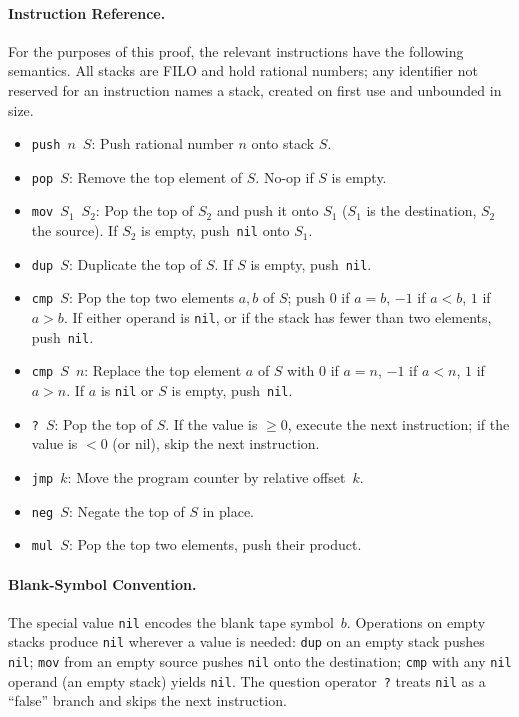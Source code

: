 \paragraph{Instruction Reference.}
For the purposes of this proof, the relevant \sculpt instructions have the following semantics. All stacks are FILO and hold rational numbers; any identifier not reserved for an instruction names a stack, created on first use and unbounded in size.

\begin{itemize}
    \item \texttt{push}~$n$~$S$: Push rational number $n$ onto stack $S$.
    \item \texttt{pop}~$S$: Remove the top element of $S$. No-op if $S$ is empty.
    \item \texttt{mov}~$S_1$~$S_2$: Pop the top of $S_2$ and push it onto $S_1$ ($S_1$ is the destination, $S_2$ the source). If $S_2$ is empty, push~\texttt{nil} onto $S_1$.
    \item \texttt{dup}~$S$: Duplicate the top of $S$. If $S$ is empty, push~\texttt{nil}.
    \item \texttt{cmp}~$S$: Pop the top two elements $a, b$ of $S$; push $0$ if $a = b$, $-1$ if $a < b$, $1$ if $a > b$. If either operand is \texttt{nil}, or if the stack has fewer than two elements, push~\texttt{nil}.
    \item \texttt{cmp}~$S$~$n$: Replace the top element $a$ of $S$ with $0$ if $a = n$, $-1$ if $a < n$, $1$ if $a > n$. If $a$ is \texttt{nil} or $S$ is empty, push~\texttt{nil}.
    \item \texttt{?}~$S$: Pop the top of $S$. If the value is $\geq 0$, execute the next instruction; if the value is $< 0$ (or nil), skip the next instruction.
    \item \texttt{jmp}~$k$: Move the program counter by relative offset~$k$.
    \item \texttt{neg}~$S$: Negate the top of $S$ in place.
    \item \texttt{mul}~$S$: Pop the top two elements, push their product.
\end{itemize}

\paragraph{Blank-Symbol Convention.}
The special value \texttt{nil} encodes the blank tape symbol~$b$. Operations on empty stacks produce \texttt{nil} wherever a value is needed: \texttt{dup} on an empty stack pushes \texttt{nil}; \texttt{mov} from an empty source pushes \texttt{nil} onto the destination; \texttt{cmp} with any \texttt{nil} operand (\eg an empty stack) yields \texttt{nil}. The question operator~\texttt{?} treats \texttt{nil} as a ``false'' branch and skips the next instruction.

